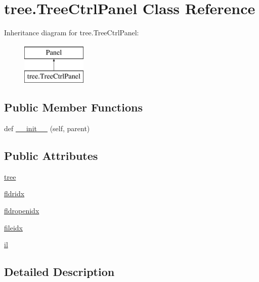 \hypertarget{classtree_1_1TreeCtrlPanel}{}\section{tree.\+Tree\+Ctrl\+Panel Class Reference}
\label{classtree_1_1TreeCtrlPanel}
Inheritance diagram for tree.\+Tree\+Ctrl\+Panel\+:\begin{figure}[H]
\begin{center}
\leavevmode
\includegraphics[height=2.000000cm]{classtree_1_1TreeCtrlPanel}
\end{center}
\end{figure}
\subsection*{Public Member Functions}
\begin{DoxyCompactItemize}
\item 
def \hyperlink{classtree_1_1TreeCtrlPanel_a7186d9554ffd4aaa2b753cea3fb35239}{\+\_\+\+\_\+init\+\_\+\+\_\+} (self, parent)
\end{DoxyCompactItemize}
\subsection*{Public Attributes}
\begin{DoxyCompactItemize}
\item 
\hyperlink{classtree_1_1TreeCtrlPanel_add705d7a471f6f93110250ff8ca9cede}{tree}
\item 
\hyperlink{classtree_1_1TreeCtrlPanel_a9dedbbc0b6aa0fb6e71ce8a4d073f000}{fldridx}
\item 
\hyperlink{classtree_1_1TreeCtrlPanel_ac9d97abe845ba6a991ccae80295ca72e}{fldropenidx}
\item 
\hyperlink{classtree_1_1TreeCtrlPanel_a329afaebcd954a826bf2105603847b52}{fileidx}
\item 
\hyperlink{classtree_1_1TreeCtrlPanel_a78a6e29067f5bb18636e006e97b27003}{il}
\end{DoxyCompactItemize}


\subsection{Detailed Description}


